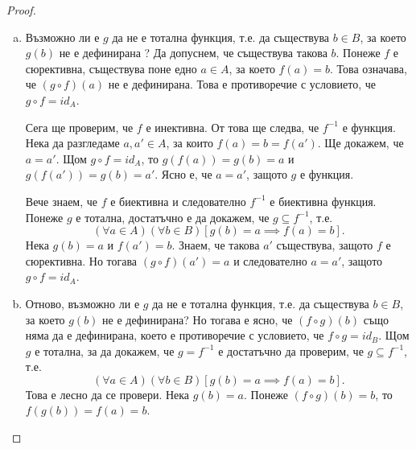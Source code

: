 \begin{proof}
  \begin{enumerate}[a)]
  \item 
    Възможно ли е $g$ да не е тотална функция, т.е. да съществува $b\in B$, 
    за което $g(b)$ не е дефинирана ?
    Да допуснем, че съществува такова $b$. 
    Понеже $f$ е сюрективна, съществува поне едно $a \in A$, за което $f(a) = b$.
    Това означава, че $(g\circ f)(a)$ не е дефинирана. Това е противоречие с условието, че $g\circ f = id_A$.
    
    Сега ще проверим, че $f$ е инективна. От това ще следва, че $f^{-1}$ е функция.
    Нека да разгледаме $a, a' \in A$,  за които $f(a) = b = f(a')$. Ще докажем, че $a = a'$.
    Щом $g\circ f = id_A$, то $g(f(a)) = g(b) = a$  и $g(f(a'))= g(b) = a'$.
    Ясно е, че $a = a'$, защото $g$ е функция.

    Вече знаем, че $f$ е биективна и следователно $f^{-1}$ е биективна функция. 
    Понеже $g$ е тотална, достатъчно е да докажем, че $g \subseteq f^{-1}$, т.е.
    \[(\forall a\in A)(\forall b\in B)[g(b) = a \implies f(a) = b].\]
    Нека $g(b) = a$ и $f(a') = b$. Знаем, че такова $a'$ съществува, защото $f$ е сюрективна.
    Но тогава $(g\circ f)(a') = a$ и следователно $a = a'$, защото $g\circ f = id_A$.
  \item    
    Отново, възможно ли е $g$ да не е тотална функция, т.е. да съществува $b\in B$, за което $g(b)$ не е дефинирана?
    Но тогава е ясно, че $(f\circ g)(b)$ също няма да е дефинирана, което е противоречие с условието, че $f\circ g = id_B$.
    Щом $g$ е тотална, за да докажем, че $g = f^{-1}$ е достатъчно да проверим, че $g\subseteq f^{-1}$, т.е.
    \[(\forall a\in A)(\forall b\in B)[g(b) = a \implies f(a) = b].\]
    Това е лесно да се провери. Нека $g(b) = a$. Понеже $(f\circ g)(b) = b$, то $f(g(b)) = f(a) = b$.
  \end{enumerate}
\end{proof}






